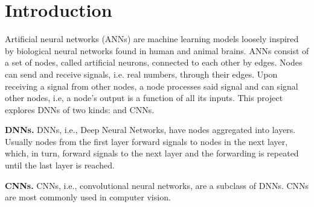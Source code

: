 \section{Introduction}
\label{sec:intro}
Artificial neural networks (ANNs) are machine learning models loosely inspired by biological neural networks found in human and animal brains. ANNs consist of a set of nodes, called artificial neurons, connected to each other by edges. Nodes can send and receive signals, i.e. real numbers, through their edges. Upon receiving a signal from other nodes, a node processes said signal and can signal other nodes, i.e, a node's output is a function of all its inputs. This project explores DNNs of two kinds: and CNNs.

\textbf{DNNs.} DNNs, i.e., Deep Neural Networks, have nodes aggregated into layers. Usually nodes from the first layer forward signals to nodes in the next layer, which, in turn, forward signals to the next layer and the forwarding is repeated until the last layer is reached.

\textbf{CNNs.} CNNs, i.e., convolutional neural networks, are a subclass of DNNs. CNNs are most commonly used in computer vision.
